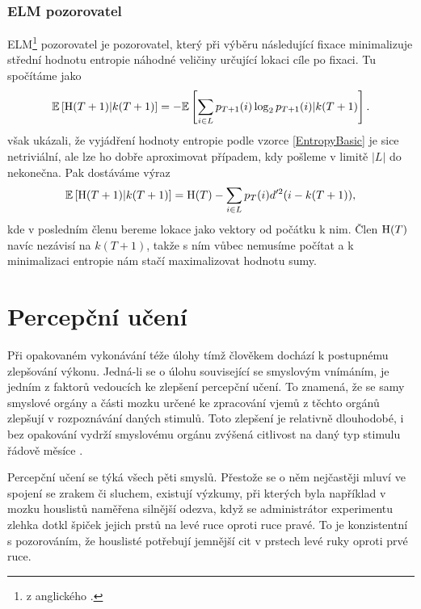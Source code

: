 \subsubsection{ELM pozorovatel}

ELM\footnote{z anglického .} pozorovatel je
pozorovatel, který při výběru následující fixace minimalizuje střední hodnotu
entropie náhodné veličiny určující lokaci cíle po fixaci. Tu spočítáme jako
\begin{equation}\label{EntropyBasic}\mathbb{E}\left[\operatorname{H}(T+1)|k(T+1)\right]=-\mathbb{E}\left[\displaystyle\sum_{i\in
L}p_{T+1}(i)\log_2p_{T+1}(i)|k(T+1)\right].\end{equation} \citet{Najemnik09} však ukázali,
že vyjádření hodnoty entropie podle vzorce \eqref{EntropyBasic} je sice
netriviální, ale lze ho dobře aproximovat případem, kdy pošleme v limitě $|L|$
do nekonečna. Pak dostáváme výraz $$ \mathbb{E}\left[\operatorname{H}(T+1)|k(T+1)\right]= \operatorname{H}(T) -
\displaystyle\sum_{i\in L} p_T(i)d'^2(i-k(T+1)),$$ kde v posledním členu bereme
lokace jako vektory od počátku k nim. Člen $\operatorname{H}(T)$ navíc nezávisí na $k(T+1)$,
takže s ním vůbec nemusíme počítat a k minimalizaci entropie nám stačí
maximalizovat hodnotu sumy.


\section{Percepční učení}

Při opakovaném vykonávání téže úlohy tímž člověkem dochází k postupnému
zlepšování výkonu. Jedná-li se o úlohu související se smyslovým vnímáním, je
jedním z faktorů vedoucích ke zlepšení percepční učení. To znamená, že se samy
smyslové orgány a části mozku určené ke zpracování vjemů z těchto orgánů
zlepšují v rozpoznávání daných stimulů. Toto zlepšení je relativně dlouhodobé,
i bez opakování vydrží smyslovému orgánu zvýšená citlivost na daný typ stimulu
řádově měsíce \citep{uceni2}.

Percepční učení se týká všech pěti smyslů. Přestože se o něm nejčastěji mluví
ve spojení se zrakem či sluchem, existují výzkumy, při kterých byla například v mozku
houslistů naměřena silnější odezva, když se administrátor experimentu zlehka dotkl
špiček jejich prstů na levé ruce oproti ruce pravé. To je konzistentní s pozorováním,
že houslisté potřebují jemnější cit v prstech levé ruky oproti prvé ruce.

